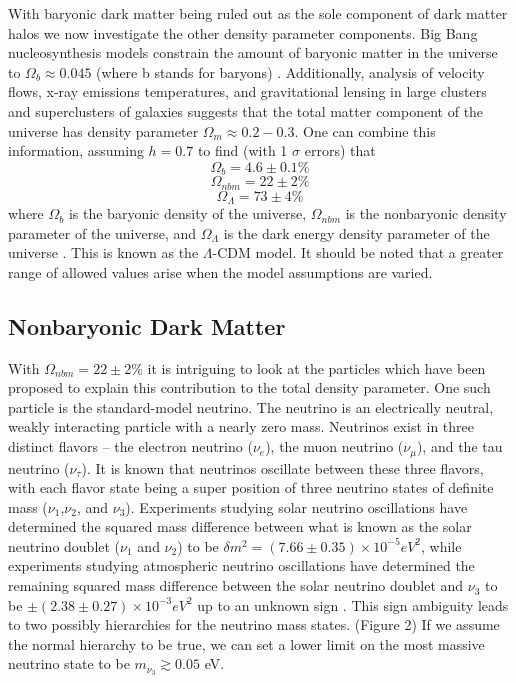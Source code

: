 \documentclass[a4paper,12pt]{article}
\begin{document}
With baryonic dark matter being ruled out as the sole component of dark matter halos we now investigate the other density parameter components. Big Bang nucleosynthesis models constrain the amount of baryonic matter in the universe to $\Omega_b \approx 0.045$ (where b stands for baryons) \cite{Tytler}.  Additionally, analysis of velocity flows, x-ray emissions temperatures, and gravitational lensing in large clusters and superclusters of galaxies suggests that the total matter component of the universe has density parameter $\Omega_m \approx 0.2-0.3$.  One can combine this information, assuming $h=0.7$ to find (with 1 $\sigma$ errors) that
\[\Omega_b = 4.6 \pm 0.1\% \]
\[\Omega_{nbm} = 22 \pm 2\% \]
\[\Omega_\Lambda =73 \pm 4\% \]
where $\Omega_b$ is the baryonic density of the universe, $\Omega_{nbm}$ is the nonbaryonic density parameter of the universe, and $\Omega_\Lambda$ is the dark energy density parameter of the universe \cite{Spergel}. This is known as the $\Lambda$-CDM model.  It should be noted that a greater range of allowed values arise when the model assumptions are varied. 

\subsection{Nonbaryonic Dark Matter}

With $\Omega_{nbm} = 22 \pm 2 \% $ it is intriguing to look at the particles which have been proposed to explain this contribution to the total density parameter. One such particle is the standard-model neutrino.  The neutrino is an electrically neutral, weakly interacting particle with a nearly zero mass.  Neutrinos exist in three distinct flavors -- the electron neutrino ($\nu_e$), the muon neutrino ($\nu_\mu$), and the tau neutrino ($\nu_\tau$).  It is known that neutrinos oscillate between these three flavors, with each flavor state being a super position of three neutrino states of definite mass ($\nu_1$,$\nu_2$, and $\nu_3$).  Experiments studying solar neutrino oscillations have determined the squared mass difference between what is known as the solar neutrino doublet ($\nu_1$ and $\nu_2$) to be $\delta m^2 = (7.66 \pm 0.35) \times 10^{-5} eV^2$, while experiments studying atmospheric neutrino oscillations have determined the remaining squared mass difference between the solar neutrino doublet and $\nu_3$ to be $\pm (2.38 \pm 0.27) \times 10^{-3} eV^2$ up to an unknown sign \cite{Robertson}.  This sign ambiguity leads to two possibly hierarchies for the neutrino mass states. (Figure 2)  If we assume the normal hierarchy to be true, we can set a lower limit on the most massive neutrino state to be $ m_{\nu_3} \gtrsim 0.05$ eV.
\end{document}
